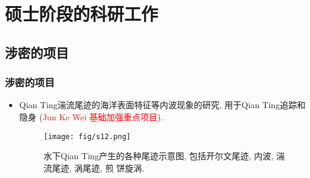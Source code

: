 \documentclass[UTF8]{ctexbeamer}	%
\theoremstyle{plain}
\theoremstyle{definition}
\theoremstyle{remark}
\numberwithin{equation}{section}
\begin{document}

\section{硕士阶段的科研工作}
\subsection{涉密的项目}
\begin{frame}
    \frametitle{涉密的项目}
    \begin{itemize}
        \item Qian Ting湍流尾迹的海洋表面特征等内波现象的研究, 用于Qian Ting追踪和隐身
              (\textcolor{red}{Jun Ke Wei
                  基础加强重点项目}).
              \begin{figure}
                  \texttt{[image: fig/s12.png]}
                  \caption{水下Qian Ting产生的各种尾迹示意图, 包括开尔文尾迹, 内波, 湍流尾迹, 涡尾迹, 煎
                      饼旋涡.}
              \end{figure}
    \end{itemize}
\end{frame}
\end{document}
